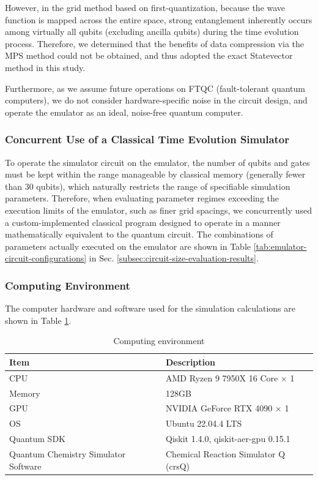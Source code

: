 \documentclass[jctc-draft.tex]{subfiles}
\begin{document}
However, in the grid method based on first-quantization, because the wave
function is mapped across the entire space, strong entanglement inherently
occurs among virtually all qubits (excluding ancilla qubits) during the time
evolution process. Therefore, we determined that the benefits of data
compression via the MPS method could not be obtained, and thus adopted the exact
Statevector method in this study.

Furthermore, as we assume future operations on FTQC (fault-tolerant quantum
computers), we do not consider hardware-specific noise in the circuit design,
and operate the emulator as an ideal, noise-free quantum computer.

\subsubsection{Concurrent Use of a Classical Time Evolution Simulator}
To operate the simulator circuit on the emulator, the number of qubits and gates
must be kept within the range manageable by classical memory (generally fewer
than 30 qubits), which naturally restricts the range of specifiable simulation
parameters. Therefore, when evaluating parameter regimes exceeding the execution
limits of the emulator, such as finer grid spacings, we concurrently used a
custom-implemented classical program designed to operate in a manner
mathematically equivalent to the quantum circuit. The combinations of parameters
actually executed on the emulator are shown in Table
\ref{tab:emulator-circuit-configurations} in Sec.
\ref{subsec:circuit-size-evaluation-results}.

\subsubsection{Computing Environment}
The computer hardware and software used for the simulation calculations are
shown in Table \ref{tab:computing-environment}.

\begin{table}[ht]
    \centering
    \caption{Computing environment}
    \begin{tabular}{ll}
        Item & Description \\
        \hline
        CPU & AMD Ryzen 9 7950X 16 Core $\times$ 1 \\
        Memory & 128GB \\
        GPU & NVIDIA GeForce RTX 4090 $\times$ 1 \\
        OS & Ubuntu 22.04.4 LTS \\
        Quantum SDK & Qiskit 1.4.0, qiskit-aer-gpu 0.15.1 \\
        Quantum Chemistry Simulator Software & Chemical Reaction Simulator Q (crsQ) \cite{website:crsq}
    \end{tabular}
    \label{tab:computing-environment}
\end{table}
\end{document}
